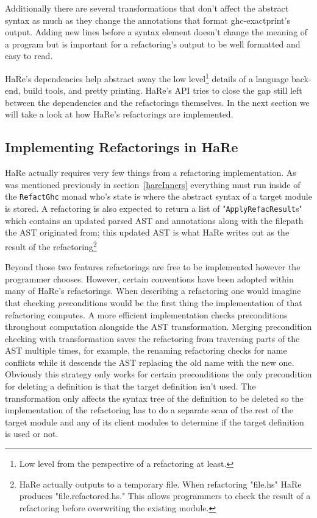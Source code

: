 Additionally there are several transformations that don't affect the abstract syntax as much as they change the annotations that format ghc-exactprint's output. Adding new lines before a syntax element doesn't change the meaning of a program but is important for a refactoring's output to be well formatted and easy to read. 

HaRe's dependencies help abstract away the low level\footnote{Low level from the perspective of a refactoring at least.} details of a language back-end, build tools, and pretty printing. HaRe's API tries to close the gap still left between the dependencies and the refactorings themselves. In the next section we will take a look at how HaRe's refactorings are implemented.

\subsection{Implementing Refactorings in HaRe}

HaRe actually requires very few things from a refactoring implementation. As was mentioned previously in section~\ref{hareInners} everything must run inside of the \texttt{RefactGhc} monad who's state is where the abstract syntax of a target module is stored. A refactoring is also expected to return a list of  "\texttt{ApplyRefacResult}s" which contains an updated parsed AST and annotations along with the filepath the AST originated from; this updated AST is what HaRe writes out as the result of the refactoring\footnote{HaRe actually outputs to a temporary file. When refactoring "file.hs" HaRe produces "file.refactored.hs." This allows programmers to check the result of a refactoring before overwriting the existing module.}  


Beyond those two features refactorings are free to be implemented however the programmer chooses. However, certain conventions have been adopted within many of HaRe's refactorings. When describing a refactoring one would imagine that checking \textit{pre}conditions would be the first thing the implementation of that refactoring computes. A more efficient implementation checks preconditions throughout computation alongside the AST transformation. Merging precondition checking with transformation saves the refactoring from traversing parts of the AST multiple times, for example, the renaming refactoring checks for name conflicts while it descends the AST replacing the old name with the new one. Obviously this strategy only works for certain preconditions the only precondition for deleting a definition is that the target definition isn't used. The transformation only affects the syntax tree of the definition to be deleted so the implementation of the refactoring has to do a separate scan of the rest of the target module and any of its client modules to determine if the target definition is used or not. 

